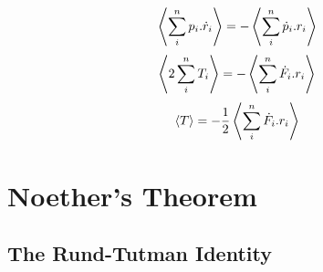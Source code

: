	\begin{equation}
		\expectationvalue{\sum_{i}^{n} p_{i} . \dot{r}_{i}} = - \expectationvalue{\sum_{i}^{n} \dot{p}_{i} . r_{i}}
		\end{equation}
		\begin{equation}
		\expectationvalue{2 \sum_{i}^{n} T_{i}} = - \expectationvalue{\sum_{i}^{n} \dot{F}_{i} . r_{i}}
		\end{equation}
		\begin{equation}
		\expectationvalue{T} = - \frac{1}{2} \expectationvalue{\sum_{i}^{n} \dot{F}_{i} . r_{i}}
		\end{equation}
\section{Noether's Theorem}
\subsection{The Rund-Tutman Identity}
